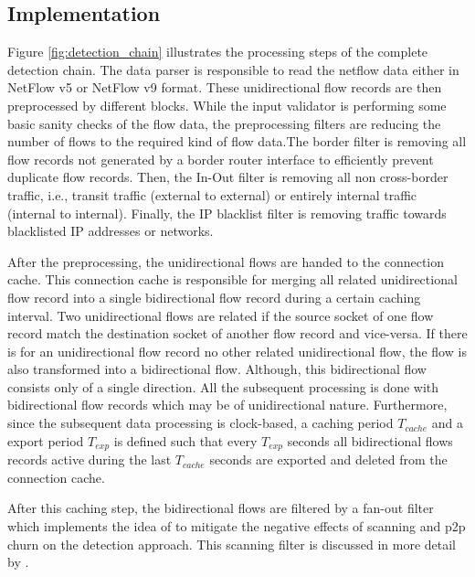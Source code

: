 \subsection{Implementation}
Figure \ref{fig:detection_chain} illustrates the processing steps of the complete detection chain. The data parser is responsible to read the netflow data either in NetFlow v5 or NetFlow v9 format. These unidirectional flow records are then preprocessed by different blocks. While the input validator is performing some basic sanity checks of the flow data, the preprocessing filters are reducing the number of flows to the required kind of flow data.The border filter is removing all flow records not generated by a border router interface to efficiently prevent duplicate flow records. Then, the In-Out filter is removing all non cross-border traffic, i.e., transit traffic (external to external) or entirely internal traffic (internal to internal). Finally, the IP blacklist filter is removing traffic towards blacklisted IP addresses or networks.

After the preprocessing, the unidirectional flows are handed to the connection cache. This connection cache is responsible for merging all related unidirectional flow record into a single bidirectional flow record during a certain caching interval. 
Two unidirectional flows are related if the source socket of one flow record match the destination socket of another flow record and vice-versa\citep{Schatzmann:Tracing}. If there is for an unidirectional flow record no other related unidirectional flow, the flow is also transformed into a bidirectional flow. Although, this bidirectional flow consists only of a single direction. All the subsequent processing is done with bidirectional flow records which may be of unidirectional nature. 
Furthermore, since the subsequent data processing is clock-based, a caching period $T_{cache}$ and a export period $T_{exp}$ is defined such that every $T_{exp}$ seconds all bidirectional flows records active during the last $T_{cache}$ seconds are exported and deleted from the connection cache.

After this caching step, the bidirectional flows are filtered by a fan-out filter which implements the idea of \citet{Allman:2007} to mitigate the negative effects of scanning and \gls{p2p} churn on the detection approach. This scanning filter is discussed in more detail by \citet{Schatzmann:Mining,Schatzmann:Dissection,Schatzmann:Tracing}.

